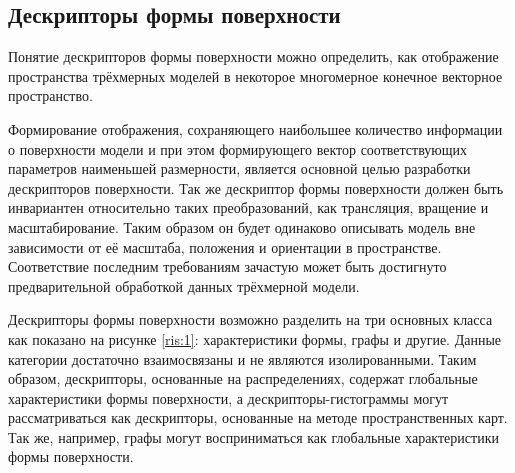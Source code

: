 \documentclass[14pt]{article}
\numberwithin{figure}{section}
\numberwithin{equation}{section}
\begin{document}
\subsection{Дескрипторы формы поверхности}

Понятие дескрипторов формы поверхности можно определить, как отображение пространства трёхмерных моделей в некоторое многомерное конечное векторное пространство.

Формирование отображения, сохраняющего наибольшее количество информации о поверхности модели и при этом формирующего вектор соответствующих параметров наименьшей размерности, является основной целью разработки дескрипторов поверхности. Так же дескриптор формы поверхности должен быть инвариантен относительно таких преобразований, как трансляция, вращение и масштабирование. Таким образом он будет одинаково описывать модель вне зависимости от её масштаба, положения и ориентации в пространстве. Соответствие последним требованиям зачастую может быть достигнуто предварительной обработкой данных трёхмерной модели.

%

Дескрипторы формы поверхности возможно разделить на три основных класса как показано на рисунке \ref{ris:1}: характеристики формы, графы и другие. Данные категории достаточно взаимосвязаны и не являются изолированными. Таким образом, дескрипторы, основанные на распределениях, содержат глобальные характеристики формы поверхности, а дескрипторы-гистограммы могут рассматриваться как дескрипторы, основанные на методе пространственных карт. Так же, например, графы могут восприниматься как глобальные характеристики формы поверхности.
\end{document}
